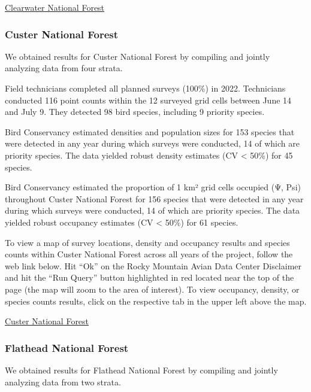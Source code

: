 \documentclass[
  letterpaper,
  DIV=11,
  numbers=noendperiod,
  oneside]{scrreprt}
\begin{document}
\href{http://www.rmbo.org/new_site/adc/QueryWindow.aspx\#N4IgzgrgDgpgTmALnAhoiBbEAuABCAYQBsYU4B3NeXAOTQEsB7AOxSNwDFG4YkQBfIA=}{Clearwater
National Forest}

\hypertarget{custer-national-forest}{%
\subsubsection{Custer National Forest}\label{custer-national-forest}}

We obtained results for Custer National Forest by compiling and jointly
analyzing data from four strata.

Field technicians completed all planned surveys (100\%) in 2022.
Technicians conducted 116 point counts within the 12 surveyed grid cells
between June 14 and July 9. They detected 98 bird species, including 9
priority species.

Bird Conservancy estimated densities and population sizes for 153
species that were detected in any year during which surveys were
conducted, 14 of which are priority species. The data yielded robust
density estimates (CV \textless{} 50\%) for 45 species.

Bird Conservancy estimated the proportion of 1 km² grid cells occupied
(Ψ, Psi) throughout Custer National Forest for 156 species that were
detected in any year during which surveys were conducted, 14 of which
are priority species. The data yielded robust occupancy estimates (CV
\textless{} 50\%) for 61 species.

To view a map of survey locations, density and occupancy results and
species counts within Custer National Forest across all years of the
project, follow the web link below. Hit ``Ok'' on the Rocky Mountain
Avian Data Center Disclaimer and hit the ``Run Query'' button
highlighted in red located near the top of the page (the map will zoom
to the area of interest). To view occupancy, density, or species counts
results, click on the respective tab in the upper left above the map.

\href{http://www.rmbo.org/new_site/adc/QueryWindow.aspx\#N4IgzgrgDgpgTmALnAhoiBbEAuABCAYQiXlwDk0BLAewDsUAbXAMWrhiRAF8g===}{Custer
National Forest}

\hypertarget{flathead-national-forest}{%
\subsubsection{Flathead National
Forest}\label{flathead-national-forest}}

We obtained results for Flathead National Forest by compiling and
jointly analyzing data from two strata.
\end{document}
